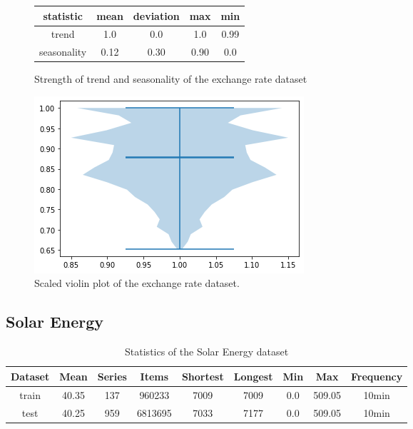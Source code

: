 \begin{figure}[htb]
    \centering
    \begin{center}
        \begin{tabular}{||c | c | c | c | c |}
            \hline
            statistic   & mean & deviation & max  & min  \\
            \hline
            trend       & 1.0  & 0.0       & 1.0  & 0.99 \\
            \hline
            seasonality & 0.12 & 0.30      & 0.90 & 0.0  \\
            \hline
            \hline
        \end{tabular}
        \caption{Strength of trend and seasonality of the exchange rate dataset}
    \end{center}
    \endminipage\hfill
    \includegraphics[width=\linewidth]{./img/exchange_rate_violin.png}
    \caption{Scaled violin plot of the exchange rate dataset.}
    \label{fig:exchange_rate_violin}
    \endminipage\hfill
\end{figure}

\clearpage
\subsection{Solar Energy}


\begin{table}[htb]
    \begin{tabular}{||c | c c c c c c c c ||}
        \hline
        Dataset & Mean  & Series & Items   & Shortest & Longest & Min & Max    & Frequency \\ [0.5ex]
        \hline\hline
        train   & 40.35 & 137    & 960233  & 7009     & 7009    & 0.0 & 509.05 & 10min     \\
        \hline
        test    & 40.25 & 959    & 6813695 & 7033     & 7177    & 0.0 & 509.05 & 10min     \\
        \hline
    \end{tabular}
    \caption{Statistics of the Solar Energy dataset}
\end{table}


